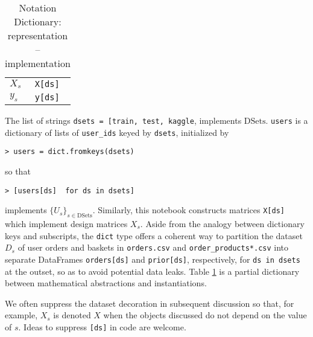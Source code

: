 \documentclass[11pt]{article}
\theoremstyle{definition}
\numberwithin{equation}{section}
\begin{document}
\begin{table}[h]
\begin{longtable}[]{@{}ll@{}}
  \begin{minipage}[t]{0.35\columnwidth}\raggedright
    \(X_s\)\strut
  \end{minipage} & \begin{minipage}[t]{0.59\columnwidth}\raggedright
    \texttt{X{[}ds{]}}\strut
  \end{minipage}\tabularnewline
  \begin{minipage}[t]{0.35\columnwidth}\raggedright
    \(y_s\)\strut
  \end{minipage} & \begin{minipage}[t]{0.59\columnwidth}\raggedright
    \texttt{y{[}ds{]}}\strut
  \end{minipage}\tabularnewline
  \bottomrule
\end{longtable}
\caption{Notation Dictionary: representation -- implementation}
\label{tbl:notation-dict}
\end{table}




The list of strings
\texttt{dsets\ =\ {[}\textquotesingle{}train\textquotesingle{},\ \textquotesingle{}test\textquotesingle{},\ \textquotesingle{}kaggle\textquotesingle{}{]}},
implements \(\mathrm{DSets}\). \texttt{users} is a dictionary of lists
of \texttt{user\_ids} keyed by \texttt{dsets}, initialized by

\medskip
\texttt{> users\ =\ dict.fromkeys(dsets)}
\medskip

so that

\medskip
\texttt{> [users{[}ds{]} \ for ds\ in\ dsets]}
\medskip

implements \(\{U_s\}_{s \in \mathrm{DSets}}\). Similarly, this notebook
constructs matrices \texttt{X{[}ds{]}} which implement design matrices \(X_s\). Aside from the analogy between dictionary keys
and subscripts, the \texttt{dict} type offers a coherent way to
partition the dataset \(D_s\) of user orders and baskets in
\texttt{orders.csv} and \texttt{order\_products*.csv} into separate
DataFrames \texttt{orders{[}ds{]}} and \texttt{prior{[}ds{]}}, respectively, for
\texttt{ds\ in\ dsets} at the outset, so as to avoid potential data leaks.
Table \ref{tbl:notation-dict} is a partial dictionary between 
mathematical abstractions and instantiations.



We often suppress the dataset decoration in subsequent discussion so
that, for example, \(X_s\) is denoted \(X\) when the objects discussed
do not depend on the value of \(s\). Ideas to suppress \texttt{{[}ds{]}}
in code are welcome.
\end{document}
